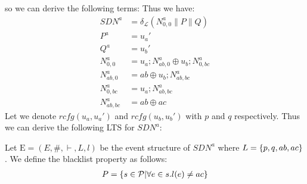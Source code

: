 \begin{example}
    so we can derive the following terms:
    Thus we have:
    \begin{align*}
        SDN^a       & = \delta_{\mathcal{L}}(N^a_{0,0}
        \parallel P \parallel Q)                         \\
        P^a         & = u_a'                               \\
        Q^a         & = u_b'                               \\
        N^a_{0,0}   & = u_a;N^a_{ab,0} \oplus u_b;N^a_{0,bc} \\
        N^a_{ab,0}  & = ab \oplus u_b;N^a_{ab,bc}          \\
        N^a_{0,bc}  & = u_a;N^a_{ab,bc}                    \\
        N^a_{ab,bc} & = ab \oplus ac
    \end{align*}
    Let we denote $rcfg(u_a,u_a')$ and $rcfg(u_b,u_b')$ with $p$ and $q$ 
    respectively.
    Thus we can derive the following LTS for $SDN^a$:
    \begin{center}
    \end{center}
    Let $\mathrm{E} = (E,\#,\vdash,L,l)$ be the event structure of $SDN^a$
    where $L = \{p,q,ab,ac\}$.
    We define the blacklist property as follows:
    \begin{align*}
        P = \{s \in \mathcal{P}| \forall e \in s. l(e) \neq ac\}
    \end{align*}  
\end{example}